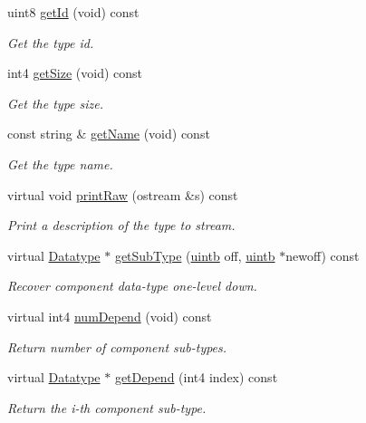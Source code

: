 \begin{DoxyCompactItemize}
uint8 \mbox{\hyperlink{class_datatype_a6b0374e8a6d4cbb1d2369dd055d72127}{get\+Id}} (void) const
\begin{DoxyCompactList}\small\item\em Get the type id. \end{DoxyCompactList}\item 
int4 \mbox{\hyperlink{class_datatype_aadd1006bf1bfff07a3230c2062e7fa52}{get\+Size}} (void) const
\begin{DoxyCompactList}\small\item\em Get the type size. \end{DoxyCompactList}\item 
const string \& \mbox{\hyperlink{class_datatype_a8e0138dcd35a04ff0e55162459843d34}{get\+Name}} (void) const
\begin{DoxyCompactList}\small\item\em Get the type name. \end{DoxyCompactList}\item 
virtual void \mbox{\hyperlink{class_datatype_a034a9b665df1a06f17fd3dfe61e7bf41}{print\+Raw}} (ostream \&s) const
\begin{DoxyCompactList}\small\item\em Print a description of the type to stream. \end{DoxyCompactList}\item 
virtual \mbox{\hyperlink{class_datatype}{Datatype}} $\ast$ \mbox{\hyperlink{class_datatype_ac310ccfdc47d145f10699fa1e14e73b4}{get\+Sub\+Type}} (\mbox{\hyperlink{types_8h_a2db313c5d32a12b01d26ac9b3bca178f}{uintb}} off, \mbox{\hyperlink{types_8h_a2db313c5d32a12b01d26ac9b3bca178f}{uintb}} $\ast$newoff) const
\begin{DoxyCompactList}\small\item\em Recover component data-\/type one-\/level down. \end{DoxyCompactList}\item 
virtual int4 \mbox{\hyperlink{class_datatype_ad29076ac4c3a28363df8f700c6fe4ffd}{num\+Depend}} (void) const
\begin{DoxyCompactList}\small\item\em Return number of component sub-\/types. \end{DoxyCompactList}\item 
virtual \mbox{\hyperlink{class_datatype}{Datatype}} $\ast$ \mbox{\hyperlink{class_datatype_a512d26d59082eeaef1351a7c448d6447}{get\+Depend}} (int4 index) const
\begin{DoxyCompactList}\small\item\em Return the i-\/th component sub-\/type. \end{DoxyCompactList}\item 

\end{DoxyCompactItemize}
